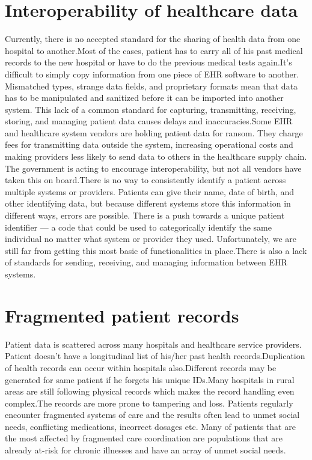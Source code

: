 \documentclass[12pt]{report}
\begin{document}
\section{Interoperability of healthcare data}
Currently, there is no accepted standard for the sharing of health data from one hospital to another.Most of the cases, patient has to carry all of his past medical records to the new hospital or have to do the previous medical tests again.It’s difficult to simply copy information from one piece of EHR software to another. Mismatched types, strange data fields, and proprietary formats mean that data has to be manipulated and sanitized before it can be imported into another system. This lack of a common standard for capturing, transmitting, receiving, storing, and managing patient data causes delays and inaccuracies.Some EHR and healthcare system vendors are holding patient data for ransom. They charge fees for transmitting data outside the system, increasing operational costs and making providers less likely to send data to others in the healthcare supply chain. The government is acting to encourage interoperability, but not all vendors have taken this on board.There is no way to consistently identify a patient across multiple systems or providers. Patients can give their name, date of birth, and other identifying data, but because different systems store this information in different ways, errors are possible. There is a push towards a unique patient identifier — a code that could be used to categorically identify the same individual no matter what system or provider they used. Unfortunately, we are still far from getting this most basic of functionalities in place.There is also a lack of standards for sending, receiving, and managing information between EHR systems.
\section{Fragmented patient records}
Patient data is scattered across many hospitals and healthcare service  providers. Patient doesn't have a longitudinal list of his/her past health records.Duplication of health records can occur within hospitals also.Different records may be generated for same patient if he forgets his unique IDs.Many hospitals in rural areas are still following physical records which makes the record handling even complex.The records are more prone to tampering and loss.
Patients regularly encounter fragmented systems of care and the results often lead to unmet social needs, conflicting medications, incorrect dosages etc. Many of patients that are the most affected by fragmented care coordination are populations that are already at-risk for chronic illnesses and have an array of unmet social needs. 
\end{document}
